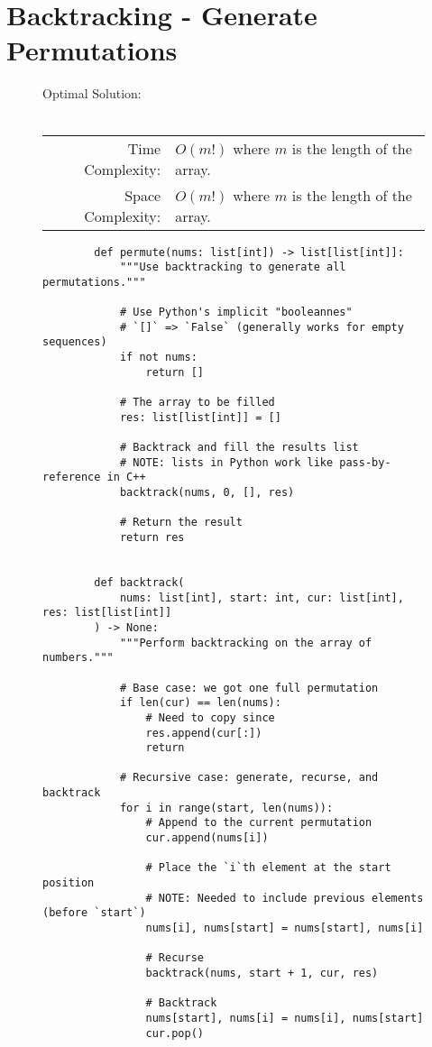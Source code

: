 
\section{Backtracking - Generate Permutations}

\begin{figure}[H]
    Optimal Solution:\\\\
    \begin{tabular}{rl}
        Time Complexity:& \(O(m!)\) where \(m\) is the length of the array.\\
        Space Complexity:& \(O(m!)\) where \(m\) is the length of the array.
    \end{tabular}
\end{figure}

\begin{figure}[H]
    \centering
    \begin{verbatim}
        def permute(nums: list[int]) -> list[list[int]]:
            """Use backtracking to generate all permutations."""

            # Use Python's implicit "booleannes"
            # `[]` => `False` (generally works for empty sequences)
            if not nums:
                return []

            # The array to be filled
            res: list[list[int]] = []

            # Backtrack and fill the results list
            # NOTE: lists in Python work like pass-by-reference in C++
            backtrack(nums, 0, [], res)

            # Return the result
            return res


        def backtrack(
            nums: list[int], start: int, cur: list[int], res: list[list[int]]
        ) -> None:
            """Perform backtracking on the array of numbers."""

            # Base case: we got one full permutation
            if len(cur) == len(nums):
                # Need to copy since
                res.append(cur[:])
                return

            # Recursive case: generate, recurse, and backtrack
            for i in range(start, len(nums)):
                # Append to the current permutation
                cur.append(nums[i])

                # Place the `i`th element at the start position
                # NOTE: Needed to include previous elements (before `start`)
                nums[i], nums[start] = nums[start], nums[i]

                # Recurse
                backtrack(nums, start + 1, cur, res)

                # Backtrack
                nums[start], nums[i] = nums[i], nums[start]
                cur.pop()
    \end{verbatim}
\end{figure}
